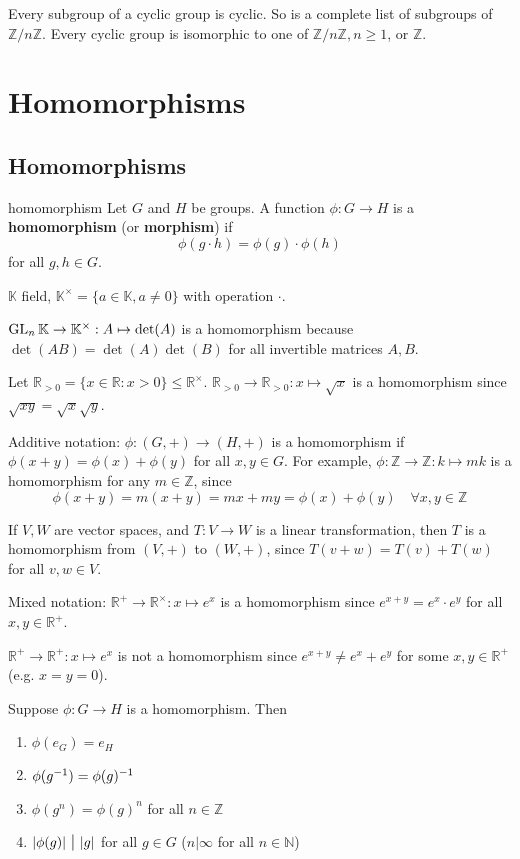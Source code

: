 Every subgroup of a cyclic group is cyclic. So  is a complete list of subgroups of $\mathbb Z /n\mathbb Z$. Every cyclic group is isomorphic to one of $\mathbb Z/n\mathbb Z, n\ge 1$, or $\mathbb Z$.

\chapter{Homomorphisms}
\section{Homomorphisms}
\begin{defn}{homomorphism}
Let $G$ and $H$ be groups. A function $\phi: G\to H$ is a \textbf{homomorphism} (or \textbf{morphism}) if 
$$
\phi(g\cdot h) = \phi(g)\cdot \phi(h)
$$
for all $g,h\in G$.
\end{defn}

\begin{ex}
$\mathbb K$ field, $\mathbb K^\times = \{a\in \mathbb K, a\ne 0\}$ with operation $\cdot$.

$\operatorname{GL}_n \mathbb K\to \mathbb K^\times: A\mapsto \det(A)$ is a homomorphism because $\det(AB)=\det(A)\det(B)$ for all invertible matrices $A,B$.

Let $\mathbb R_{>0} = \{x\in \mathbb R: x>0\}\le \mathbb R^\times$. $\mathbb R_{>0}\to \mathbb R_{>0}: x\mapsto \sqrt{x}$ is a homomorphism since $\sqrt{xy}=\sqrt x \sqrt y$.

Additive notation: $\phi: (G,+)\to (H,+)$ is a homomorphism if $\phi(x+y)=\phi(x)+\phi(y)$ for all $x,y\in G$. For example, $\phi:\mathbb Z\to \mathbb Z: k\mapsto mk$ is a homomorphism for any $m\in \mathbb Z$, since 
$$\phi(x+y)=m(x+y)=mx+my = \phi(x)+\phi(y) \quad \forall x,y \in \mathbb Z$$

If $V,W$ are vector spaces, and $T: V\to W$ is a linear transformation, then $T$ is a homomorphism from $(V,+)$ to $(W,+)$, since $T(v+w)=T(v)+T(w)$ for all $v,w\in V$.

Mixed notation: $\mathbb R^+\to \mathbb R^\times: x\mapsto e^x$ is a homomorphism since $e^{x+y}=e^x\cdot e^y$ for all $x,y\in\mathbb R^+$.

$\mathbb R^+\to \mathbb R^+: x\mapsto e^x$ is  not a homomorphism since $e^{x+y}\ne e^x + e^y$ for some    $x,y\in\mathbb R^+$ (e.g. $x=y=0$). 
\end{ex}


\begin{lemma}
Suppose $\phi: G\to H$ is a homomorphism. Then
\begin{enumerate}[label=(\alph*)]
\item $\phi(e_G)=e_H$
\item $\phi(g^{-1})=\phi(g)^{-1}$
\item $\phi(g^n)= \phi(g)^n$ for all $n\in \mathbb Z$
\item $|\phi(g)| \midd |g|$ for all $g\in G$ ($n|\infty $ for all $n\in \mathbb N$)
\end{enumerate}
\end{lemma}

